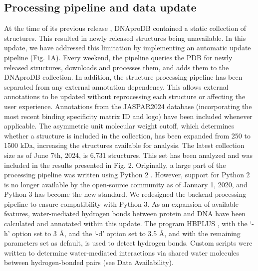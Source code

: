\subsection{Processing pipeline and data update}
At the time of its previous release \citep{Sagendorf2020}, DNAproDB contained a static collection of structures. This resulted in newly released structures being unavailable. In this update, we have addressed this limitation by implementing an automatic update pipeline (Fig. 1A). Every weekend, the pipeline queries the PDB for newly released structures, downloads and processes them, and adds them to the DNAproDB collection. 
In addition, the structure processing pipeline has been separated from any external annotation dependency. This allows external annotations to be updated without reprocessing each structure or affecting the user experience. Annotations from the JASPAR2024 \citep{Rauluseviciute2024} database (incorporating the most recent binding specificity matrix ID and logo) have been included whenever applicable. 
The asymmetric unit molecular weight cutoff, which determines whether a structure is included in the collection, has been expanded from 250 to 1500 kDa, increasing the structures available for analysis. The latest collection size as of June 7th, 2024, is 6,731 structures. This set has been analyzed and was included in the results presented in Fig. 2. 
Originally, a large part of the processing pipeline was written using Python 2 \citep{Guido1995}. However, support for Python 2 is no longer available by the open-source community as of January 1, 2020, and Python 3 \citep{Guido2009} has become the new standard. We redesigned the backend processing pipeline to ensure compatibility with Python 3. 
As an expansion of available features, water-mediated hydrogen bonds between protein and DNA have been calculated and annotated within this update. The program HBPLUS \citep{McDonald1994}, with the ‘-h’ option set to 3 Å, and the ‘-d’ option set to 3.5 Å, and with the remaining parameters set as default, is used to detect hydrogen bonds. Custom scripts were written to determine water-mediated interactions via shared water molecules between hydrogen-bonded pairs (see Data Availability).  


